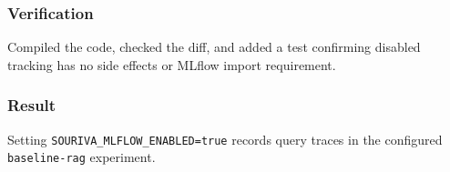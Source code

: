 \subsubsection{Verification}

Compiled the code, checked the diff, and added a test confirming disabled tracking has no side effects or MLflow import requirement.

\subsubsection{Result}

Setting \texttt{SOURIVA\_MLFLOW\_ENABLED=true} records query traces in the configured \texttt{baseline-rag} experiment.

